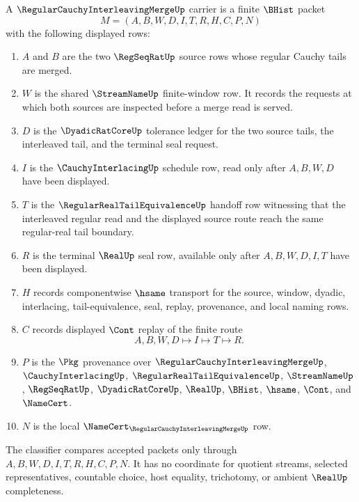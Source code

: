 \begin{definition}
\label{def:regular-cauchy-interleaving-merge-carrier}
A $\RegularCauchyInterleavingMergeUp$ carrier is a finite $\BHist$ packet
$$
M=(A,B,W,D,I,T,R,H,C,P,N)
$$
with the following displayed rows:
\begin{enumerate}
\item $A$ and $B$ are the two $\RegSeqRatUp$ source rows whose regular Cauchy tails are merged.
\item $W$ is the shared $\StreamNameUp$ finite-window row. It records the requests at which both sources are inspected before a merge read is served.
\item $D$ is the $\DyadicRatCoreUp$ tolerance ledger for the two source tails, the interleaved tail, and the terminal seal request.
\item $I$ is the $\CauchyInterlacingUp$ schedule row, read only after $A,B,W,D$ have been displayed.
\item $T$ is the $\RegularRealTailEquivalenceUp$ handoff row witnessing that the interleaved regular read and the displayed source route reach the same regular-real tail boundary.
\item $R$ is the terminal $\RealUp$ seal row, available only after $A,B,W,D,I,T$ have been displayed.
\item $H$ records componentwise $\hsame$ transport for the source, window, dyadic, interlacing, tail-equivalence, seal, replay, provenance, and local naming rows.
\item $C$ records displayed $\Cont$ replay of the finite route
$$
A,B,W,D \longmapsto I \longmapsto T \longmapsto R .
$$
\item $P$ is the $\Pkg$ provenance over $\RegularCauchyInterleavingMergeUp$, $\CauchyInterlacingUp$, $\RegularRealTailEquivalenceUp$, $\StreamNameUp$, $\RegSeqRatUp$, $\DyadicRatCoreUp$, $\RealUp$, $\BHist$, $\hsame$, $\Cont$, and $\NameCert$.
\item $N$ is the local $\NameCert_{\RegularCauchyInterleavingMergeUp}$ row.
\end{enumerate}
The classifier compares accepted packets only through $A,B,W,D,I,T,R,H,C,P,N$. It has no coordinate for quotient streams, selected representatives, countable choice, host equality, trichotomy, or ambient $\RealUp$ completeness.
\end{definition}

